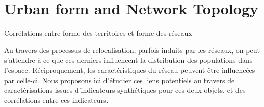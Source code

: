 

\newpage





\section{Urban form and Network Topology}{Corrélations entre forme des territoires et forme des réseaux}




\label{sec:staticcorrelations}





Au travers des processus de relocalisation, parfois induits par les réseaux, on peut s'attendre à ce que ces derniers influencent la distribution des populations dans l'espace. Réciproquement, les caractéristiques du réseau peuvent être influencées par celle-ci. Nous proposons ici d'étudier ces liens potentiels au travers de caractérisations issues d'indicateurs synthétiques pour ces deux objets, et des corrélations entre ces indicateurs.


